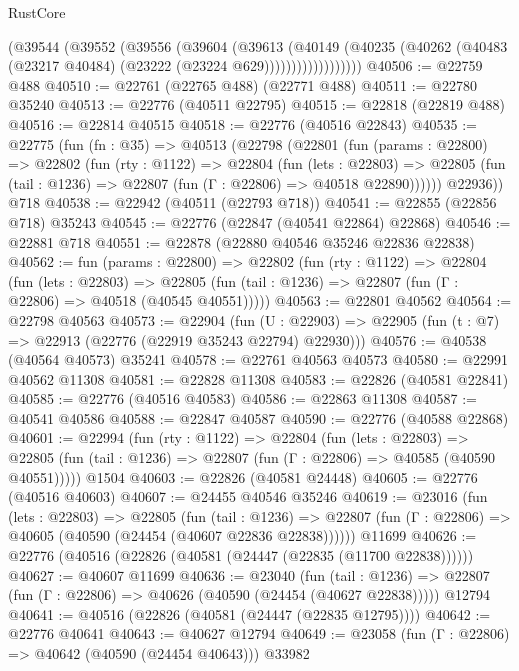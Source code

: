 \begin{lexlean}{RustCore}
\begin{coremodule}
                  (@39544
                    (@39552
                      (@39556
                        (@39604
                          (@39613
                            (@40149
                              (@40235
                                (@40262
                                  (@40483 (@23217 @40484) (@23222 (@23224 @629))))))))))))))))))
@40506 := @22759 @488
@40510 := @22761 (@22765 @488) (@22771 @488)
@40511 := @22780 @35240
@40513 := @22776 (@40511 @22795)
@40515 := @22818 (@22819 @488)
@40516 := @22814 @40515
@40518 := @22776 (@40516 @22843)
@40535 := @22775
    (fun (fn : @35) =>
    @40513
      (@22798
        (@22801
          (fun (params : @22800) =>
          @22802
            (fun (rty : @1122) =>
            @22804
              (fun (lets : @22803) =>
              @22805 (fun (tail : @1236) => @22807 (fun (Γ : @22806) => @40518 @22890))))))
        @22936))
    @718
@40538 := @22942 (@40511 (@22793 @718))
@40541 := @22855 (@22856 @718) @35243
@40545 := @22776 (@22847 (@40541 @22864) @22868)
@40546 := @22881 @718
@40551 := @22878 (@22880 @40546 @35246 @22836 @22838)
@40562 := fun (params : @22800) =>
  @22802
    (fun (rty : @1122) =>
    @22804
      (fun (lets : @22803) =>
      @22805 (fun (tail : @1236) => @22807 (fun (Γ : @22806) => @40518 (@40545 @40551)))))
@40563 := @22801 @40562
@40564 := @22798 @40563
@40573 := @22904
    (fun (U : @22903) => @22905 (fun (t : @7) => @22913 (@22776 (@22919 @35243 @22794) @22930)))
@40576 := @40538 (@40564 @40573) @35241
@40578 := @22761 @40563 @40573
@40580 := @22991 @40562 @11308
@40581 := @22828 @11308
@40583 := @22826 (@40581 @22841)
@40585 := @22776 (@40516 @40583)
@40586 := @22863 @11308
@40587 := @40541 @40586
@40588 := @22847 @40587
@40590 := @22776 (@40588 @22868)
@40601 := @22994
    (fun (rty : @1122) =>
    @22804
      (fun (lets : @22803) =>
      @22805 (fun (tail : @1236) => @22807 (fun (Γ : @22806) => @40585 (@40590 @40551)))))
    @1504
@40603 := @22826 (@40581 @24448)
@40605 := @22776 (@40516 @40603)
@40607 := @24455 @40546 @35246
@40619 := @23016
    (fun (lets : @22803) =>
    @22805
      (fun (tail : @1236) =>
      @22807 (fun (Γ : @22806) => @40605 (@40590 (@24454 (@40607 @22836 @22838))))))
    @11699
@40626 := @22776 (@40516 (@22826 (@40581 (@24447 (@22835 (@11700 @22838))))))
@40627 := @40607 @11699
@40636 := @23040
    (fun (tail : @1236) => @22807 (fun (Γ : @22806) => @40626 (@40590 (@24454 (@40627 @22838)))))
    @12794
@40641 := @40516 (@22826 (@40581 (@24447 (@22835 @12795))))
@40642 := @22776 @40641
@40643 := @40627 @12794
@40649 := @23058 (fun (Γ : @22806) => @40642 (@40590 (@24454 @40643))) @33982

\end{coremodule}
\end{lexlean}

